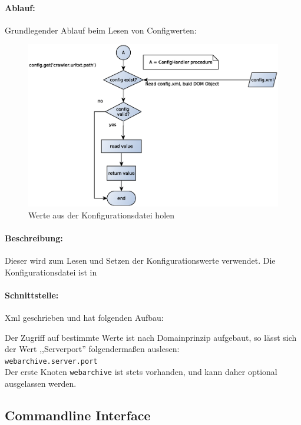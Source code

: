 \paragraph{Ablauf:}
\label{par:ablauf_}
Grundlegender Ablauf beim Lesen von Configwerten:
\begin{figure}[h]
	\centering
	\label{dia:design:backend:overview}
	\includegraphics[width=\textwidth]{design/backend/gfx/getting_value.eps}
	\caption{Werte aus der Konfigurationsdatei holen}
\end{figure}



\paragraph{Beschreibung:}
\label{par:beschreibung_}
Dieser wird zum Lesen und Setzen der Konfigurationswerte verwendet. Die Konfigurationsdatei ist in 
\paragraph{Schnittstelle:}
\label{par:schnittstelle_}
Xml geschrieben und hat folgenden Aufbau:
    
Der Zugriff auf bestimmte Werte ist nach Domainprinzip aufgebaut, so lässt sich der Wert ,,Serverport'' folgendermaßen auslesen: \\
\texttt{webarchive.server.port} \\
Der erste Knoten \texttt{webarchive} ist stets vorhanden, und kann daher optional ausgelassen werden.


\subsection{Commandline Interface}
\label{sub:commandline_interface}
